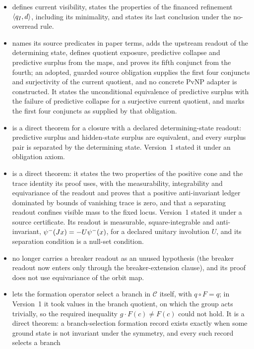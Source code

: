 \begin{itemize}
\item {} defines current visibility, states the properties of the
  financed refinement \(\langle q_I,d\rangle\), including its
  minimality, and states its last conclusion under the no-overread rule.
\item {} names its source predicates in paper terms, adds the
  upstream readout of the determining state, defines quotient exposure,
  predictive collapse and predictive surplus from the maps, and proves its
  fifth conjunct from the fourth; an adopted, guarded source obligation supplies
  the first four conjuncts and surjectivity of the current quotient, and no
  concrete PvNP adapter is constructed. It states the unconditional equivalence of predictive surplus with the failure of predictive collapse for a surjective current quotient, and marks the first four conjuncts as supplied by that obligation.
\item {} is a direct theorem for a closure with a declared
  determining-state readout: predictive surplus and hidden-state surplus are equivalent, and every surplus pair is separated by the
  determining state. Version~1 stated it under an obligation axiom.
\item {} is a direct theorem: it states the two properties of
  the positive cone and the trace identity its proof uses, with the
  measurability, integrability and equivariance of the readout and proves that a positive anti-invariant
  ledger dominated by bounds of vanishing trace is zero, and that a
  separating readout confines visible mass to the fixed locus. Version~1
  stated it under a source certificate. Its readout is measurable, square-integrable and anti-invariant, \(\psi^-(J x)=-U\psi^-(x)\), for a declared unitary involution \(U\), and its separation condition is a null-set condition.
\item {} no longer carries a breaker readout as an unused hypothesis
  (the breaker readout now enters only through the breaker-extension clause), and its
  proof does not use equivariance of the orbit map.
\item {} lets the formation operator select a branch in
  \(\mathcal C\) itself, with \(q\circ F=q\); in Version~1 it took values in
  the branch quotient, on which the group acts trivially, so the required
  inequality \(g\cdot F(c)\ne F(c)\) could not hold. It is a direct theorem:
  a branch-selection formation record exists exactly when some ground state
  is not invariant under the symmetry, and every such record selects a branch

\end{itemize}
